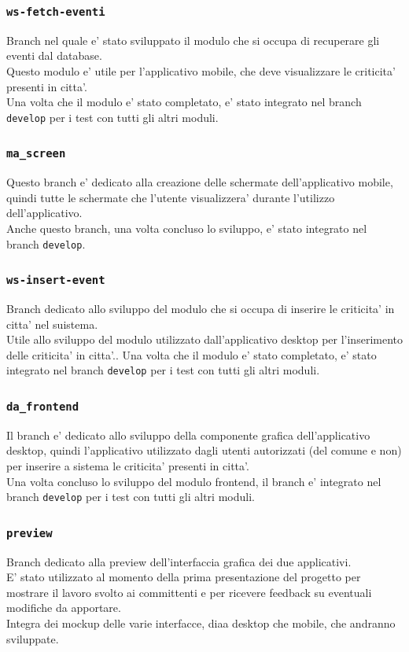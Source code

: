 \documentclass{article}
\begin{document}
\subsubsection{\texttt{ws-fetch-eventi}}
Branch nel quale e' stato sviluppato il modulo che si occupa di recuperare gli eventi dal database.\\
Questo modulo e' utile per l'applicativo mobile, che deve visualizzare le criticita' presenti in citta'.\\
Una volta che il modulo e' stato completato, e' stato integrato nel branch \texttt{develop} per i test con tutti gli altri moduli.

\subsubsection{\texttt{ma\_screen}}
Questo branch e' dedicato alla creazione delle schermate dell'applicativo mobile, quindi tutte le schermate che l'utente visualizzera' durante l'utilizzo dell'applicativo.\\
Anche questo branch, una volta concluso lo sviluppo, e' stato integrato nel branch \texttt{develop}.

\subsubsection{\texttt{ws-insert-event}}
Branch dedicato allo sviluppo del modulo che si occupa di inserire le criticita' in citta' nel suistema.\\
Utile allo sviluppo del modulo utilizzato dall'applicativo desktop per l'inserimento delle criticita' in citta'..
Una volta che il modulo e' stato completato, e' stato integrato nel branch \texttt{develop} per i test con tutti gli altri moduli.

\subsubsection{\texttt{da\_frontend}}
Il branch e' dedicato allo sviluppo della componente grafica dell'applicativo desktop, quindi l'applicativo utilizzato dagli utenti autorizzati (del comune e non) per inserire a sistema le criticita' presenti in citta'.\\
Una volta concluso lo sviluppo del modulo frontend, il branch e' integrato nel branch \texttt{develop} per i test con tutti gli altri moduli.

\subsubsection{\texttt{preview}}
Branch dedicato alla preview dell'interfaccia grafica dei due applicativi.\\
E' stato utilizzato al momento della prima presentazione del progetto per mostrare il lavoro svolto ai committenti e per ricevere feedback su eventuali modifiche da apportare.\\
Integra dei mockup delle varie interfacce, diaa desktop che mobile, che andranno sviluppate.
\end{document}
